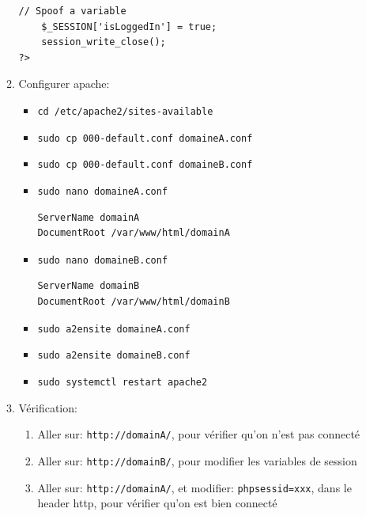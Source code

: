 \documentclass[a4paper]{article}
\begin{document}
\begin{itemize}
\begin{example}
\begin{enumerate}
\begin{lstlisting}[style=php]
    // Spoof a variable
    $_SESSION['isLoggedIn'] = true;
    session_write_close();
?>
\end{lstlisting}
    \item Configurer apache:
    \begin{itemize}
        \item \texttt{cd /etc/apache2/sites-available}
        \item \texttt{sudo cp 000-default.conf domaineA.conf}
        \item \texttt{sudo cp 000-default.conf domaineB.conf}
        \item \texttt{sudo nano domaineA.conf}
\begin{example} \begin{verbatim}
ServerName domainA
DocumentRoot /var/www/html/domainA
\end{verbatim} \end{example}
        \item \texttt{sudo nano domaineB.conf}
\begin{example} \begin{verbatim}
ServerName domainB
DocumentRoot /var/www/html/domainB
\end{verbatim} \end{example}
        \item \texttt{sudo a2ensite domaineA.conf}
        \item \texttt{sudo a2ensite domaineB.conf}
        \item \texttt{sudo systemctl restart apache2}
    \end{itemize}
    \item Vérification:
    \begin{enumerate}
        \item Aller sur: \texttt{http://domainA/}, pour vérifier qu'on n'est pas connecté
        \item Aller sur: \texttt{http://domainB/}, pour modifier les variables de session
        \item Aller sur: \texttt{http://domainA/}, et modifier: \texttt{phpsessid=xxx}, dans le header http, pour vérifier qu'on est bien connecté
    \end{enumerate}
\end{enumerate} \end{example}


\end{itemize}
\end{document}
